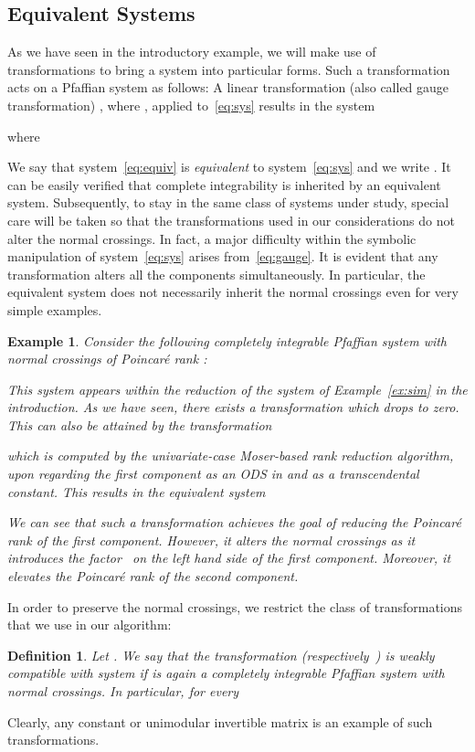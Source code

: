 \documentclass[final,1p,times,number,amsthm]{elsart}
\newtheorem{example}[lemma]{Example}
\newtheorem{definition}[lemma]{Definition}
\begin{document}
\subsection{Equivalent Systems}
As we have seen in the introductory example, we will make use of transformations
to bring a system into particular forms. Such a transformation acts on a
Pfaffian system as follows: A linear transformation (also called gauge
transformation) , where
, applied to~\eqref{eq:sys} results in the system 

where

We say that system~\eqref{eq:equiv} is \textit{equivalent} to
system~\eqref{eq:sys} and we write . It can be easily
verified that complete integrability is inherited by an equivalent
system. Subsequently, to stay in the same class of systems under study, special
care will be taken so that the transformations used in our considerations do not
alter the normal crossings. In fact, a major difficulty within the symbolic
manipulation of system~\eqref{eq:sys} arises from~\eqref{eq:gauge}. It is
evident that any transformation alters all the components simultaneously. In
particular, the equivalent system does not necessarily inherit the normal
crossings even for very simple examples.
\begin{example}\cite[Section 4]{key5}
\label{exmnaive}
Consider the following completely integrable Pfaffian system with normal
crossings of Poincar\'e rank :

This system appears within the reduction of the system of Example~\ref{ex:sim}
in the introduction. As we have seen, there exists a transformation which
drops  to zero. This can also be attained by the transformation

which is computed by the univariate-case Moser-based rank reduction algorithm,
upon regarding the first component as an ODS in  and  as a
transcendental constant. This results in the equivalent system

We can see that such a transformation achieves the goal of reducing the
Poincar\'e rank of the first component. However, it alters the normal crossings
as it introduces the factor~ on the left hand side of the first
component. Moreover, it elevates the Poincar\'e rank of the second component.
\end{example}
In order to preserve the normal crossings, we restrict the class of
transformations that we use in  our algorithm:
 \begin{definition}
\label{wcompatible}
Let . We say that the transformation  (respectively~) is \textit{weakly compatible} with system  if  is
again a completely integrable Pfaffian system with normal crossings. In
particular,  for every

\end{definition}
Clearly, any constant or unimodular invertible matrix is an example of such
transformations. 
\end{document}
